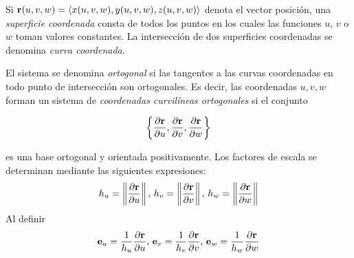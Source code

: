 Si ${\bf r}(u,v,w)=\langle x(u,v,w),y(u,v,w),z(u,v,w)  \rangle$
denota el vector posición,
una \emph{superficie coordenada} consta de todos los puntos en los cuales las funciones  $u$, $v$ o $w$ toman valores constantes. La intersección de dos superficies coordenadas se denomina \emph{curva coordenada}.

El sistema se denomina \emph{ortogonal} si las tangentes a las curvas coordenadas en todo punto de intersección son ortogonales. Es decir, las coordenadas $u,v,w$ forman un sistema de \emph{coordenadas curvilíneas ortogonales} si el conjunto

\[\left \{\frac{\partial{\bf r}}{\partial u},\frac{\partial{\bf r}}{\partial v},\frac{\partial{\bf r}}{\partial w}\right \}\]

es una base ortogonal y orientada positivamente. Los factores de escala se determinan mediante las siguientes expresiones:
\[h_u= \left \Vert \frac{\partial{\bf r}}{\partial u}\right \Vert,\, h_v=\left\Vert\frac{\partial{\bf r}}{\partial v}\right\Vert,\,  h_w=\left\Vert\frac{\partial{\bf r}}{\partial w}\right\Vert\]
Al definir
\[\mathbf{e}_{u}= \frac{1}{h_u}\frac{\partial{\bf r}}{\partial u},\, \mathbf{e}_{v}=\frac{1}{h_v}\frac{\partial{\bf r}}{\partial v},\, \mathbf{e}_{w}=\frac{1}{h_w}\frac{\partial{\bf r}}{\partial w}\]

